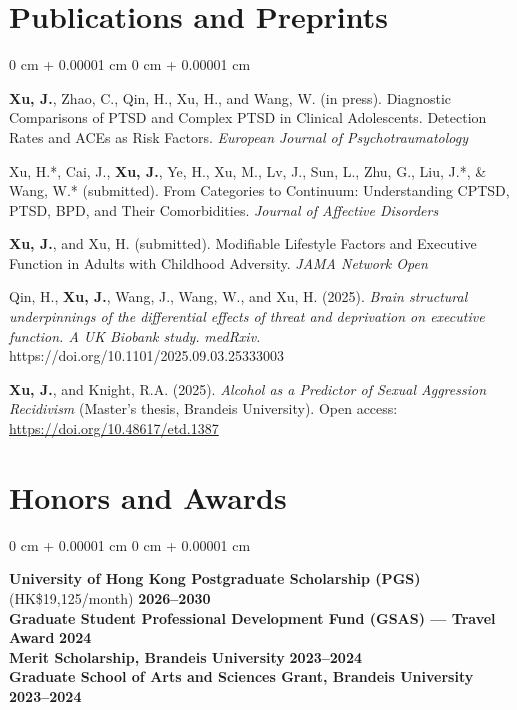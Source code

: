 \documentclass[10pt, letterpaper]{article}
\newenvironment{onecolentry}{
    \begin{adjustwidth}{
        0 cm + 0.00001 cm
    }{
        0 cm + 0.00001 cm
    }
}{
    \end{adjustwidth}
} %
\begin{document}
\section*{Publications and Preprints}
\begin{onecolentry}
\begin{list}{}{\setlength{\leftmargin}{0.5in}\setlength{\itemindent}{-0.5in}\setlength{\itemsep}{0.9ex}}

    \item \textbf{Xu, J.}, Zhao, C., Qin, H., Xu, H., and Wang, W. (in press). Diagnostic Comparisons of PTSD and Complex PTSD in Clinical Adolescents. Detection Rates and ACEs as Risk Factors. \textit{European Journal of Psychotraumatology}

    \item Xu, H.*, Cai, J., \textbf{Xu, J.}, Ye, H., Xu, M., Lv, J., Sun, L., Zhu, G., Liu, J.*, \& Wang, W.* (submitted). From Categories to Continuum: Understanding CPTSD, PTSD, BPD, and Their Comorbidities. \textit{Journal of Affective Disorders}

    \item \textbf{Xu, J.}, and Xu, H. (submitted). Modifiable Lifestyle Factors and Executive Function in Adults with Childhood Adversity. \textit{JAMA Network Open}


    \item Qin, H., \textbf{Xu, J.}, Wang, J., Wang, W., and Xu, H. (2025). \textit{Brain structural underpinnings of the differential effects of threat and deprivation on executive function. A UK Biobank study.} \textit{medRxiv.} https://doi.org/10.1101/2025.09.03.25333003

    \item \textbf{Xu, J.}, and Knight, R.A. (2025). \textit{Alcohol as a Predictor of Sexual Aggression Recidivism} (Master’s thesis, Brandeis University). Open access: \href{https://doi.org/10.48617/etd.1387}{https://doi.org/10.48617/etd.1387}

\end{list}
\end{onecolentry}

\vspace{3.75pt}
\section*{Honors and Awards}
\begin{onecolentry}
\textbf{University of Hong Kong Postgraduate Scholarship (PGS)} (HK\$19,125/month) \hfill \textbf{2026--2030} \\
\textbf{Graduate Student Professional Development Fund (GSAS) — Travel Award} \hfill \textbf{2024}\\
\textbf{Merit Scholarship, Brandeis University} \hfill \textbf{2023--2024} \\
\textbf{Graduate School of Arts and Sciences Grant, Brandeis University} \hfill \textbf{2023--2024}\\
\end{onecolentry}
\end{document}
